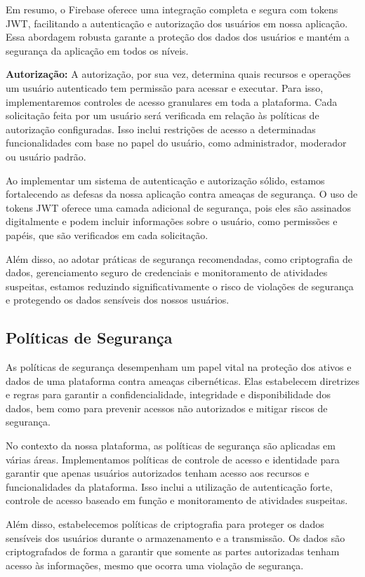 Em resumo, o Firebase oferece uma integração completa e segura com tokens JWT, facilitando a autenticação e autorização dos usuários em nossa aplicação. Essa abordagem robusta garante a proteção dos dados dos usuários e mantém a segurança da aplicação em todos os níveis.

\textbf{Autorização:}
A autorização, por sua vez, determina quais recursos e operações um usuário autenticado tem permissão para acessar e executar. Para isso, implementaremos controles de acesso granulares em toda a plataforma. Cada solicitação feita por um usuário será verificada em relação às políticas de autorização configuradas. Isso inclui restrições de acesso a determinadas funcionalidades com base no papel do usuário, como administrador, moderador ou usuário padrão.

Ao implementar um sistema de autenticação e autorização sólido, estamos fortalecendo as defesas da nossa aplicação contra ameaças de segurança. O uso de tokens JWT oferece uma camada adicional de segurança, pois eles são assinados digitalmente e podem incluir informações sobre o usuário, como permissões e papéis, que são verificados em cada solicitação.

Além disso, ao adotar práticas de segurança recomendadas, como criptografia de dados, gerenciamento seguro de credenciais e monitoramento de atividades suspeitas, estamos reduzindo significativamente o risco de violações de segurança e protegendo os dados sensíveis dos nossos usuários.

\subsection{Políticas de Segurança}

As políticas de segurança desempenham um papel vital na proteção dos ativos e dados de uma plataforma contra ameaças cibernéticas. Elas estabelecem diretrizes e regras para garantir a confidencialidade, integridade e disponibilidade dos dados, bem como para prevenir acessos não autorizados e mitigar riscos de segurança.

No contexto da nossa plataforma, as políticas de segurança são aplicadas em várias áreas. Implementamos políticas de controle de acesso e identidade para garantir que apenas usuários autorizados tenham acesso aos recursos e funcionalidades da plataforma. Isso inclui a utilização de autenticação forte, controle de acesso baseado em função e monitoramento de atividades suspeitas.

Além disso, estabelecemos políticas de criptografia para proteger os dados sensíveis dos usuários durante o armazenamento e a transmissão. Os dados são criptografados de forma a garantir que somente as partes autorizadas tenham acesso às informações, mesmo que ocorra uma violação de segurança.

